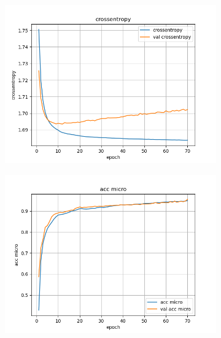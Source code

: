 \documentclass[a4paper]{article}
\begin{document}
\begin{figure}[H]
    \centering
    \begin{subfigure}{0.32\textwidth}
        \centering
        \includegraphics[width=\linewidth]{../logs/separate/crossentropy.png}
    \end{subfigure}
    \begin{subfigure}{0.32\textwidth}
        \centering
        \includegraphics[width=\linewidth]{../logs/separate/acc micro.png}
    \end{subfigure}
    \begin{subfigure}{0.32\textwidth}
        \centering

\end{subfigure}
\end{figure}
\end{document}
